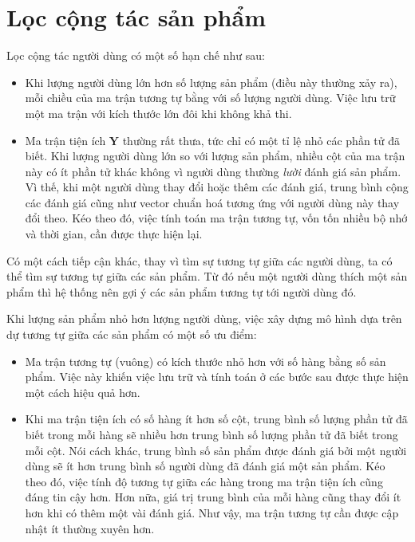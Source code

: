 \section{Lọc cộng tác sản phẩm}
\label{sec:ii}
Lọc cộng tác người dùng có một số hạn chế như sau: 
\begin{itemize}
    \item Khi lượng người dùng lớn hơn số lượng sản phẩm (điều này thường xảy ra), mỗi chiều của ma trận tương tự bằng với số lượng người dùng. Việc lưu trữ một ma
    trận với kích thước lớn đôi khi không khả thi. 

    \item Ma trận tiện ích $\mathbf{Y}$ thường rất thưa, tức chỉ có
    một tỉ lệ nhỏ các phần tử đã biết. Khi lượng người dùng lớn so với lượng sản phẩm, nhiều cột của ma trận này có ít phần tử khác không vì người dùng thường \textit{lười} đánh giá
    sản phẩm. Vì thế, khi một người dùng thay đổi hoặc thêm các đánh giá, trung bình
    cộng các
    đánh giá cũng như vector chuẩn hoá tương ứng với người dùng này
    thay đổi theo. Kéo theo đó, việc tính toán ma trận tương tự, vốn tốn
    nhiều bộ nhớ và thời gian, cần được thực hiện lại. 
\end{itemize}

Có một cách tiếp cận khác, thay vì tìm sự tương tự giữa các người dùng, ta
có thể tìm sự tương tự giữa các sản phẩm. Từ đó nếu một người dùng
thích một sản phẩm thì hệ thống nên gợi ý các sản phẩm tương tự tới
người dùng đó. 

Khi lượng sản phẩm nhỏ hơn lượng người dùng, việc xây dựng mô hình dựa trên dự tương tự giữa các sản phẩm có một số ưu điểm:
\begin{itemize}
    \item Ma trận tương tự (vuông) có kích thước nhỏ hơn với số hàng bằng số sản phẩm. Việc này khiến việc lưu trữ và
    tính toán ở các bước sau được thực hiện một cách hiệu quả hơn. 


    \item Khi ma trận tiện ích có số hàng ít hơn số cột, trung bình số lượng phần tử đã
    biết trong mỗi hàng sẽ nhiều hơn trung bình số lượng phần tử đã biết trong
    mỗi cột. Nói cách khác, trung bình số sản phẩm được đánh giá bởi một người
    dùng sẽ ít hơn trung bình số người dùng đã đánh giá một sản phẩm. Kéo theo
    đó, việc tính độ
    tương tự giữa các hàng trong ma trận tiện ích cũng đáng tin cậy hơn. Hơn nữa, giá trị trung bình
    của mỗi hàng cũng thay đổi ít hơn khi có thêm một vài đánh giá. Như vậy,
    ma trận tương tự cần được cập nhật ít thường xuyên hơn.
\end{itemize}
 
